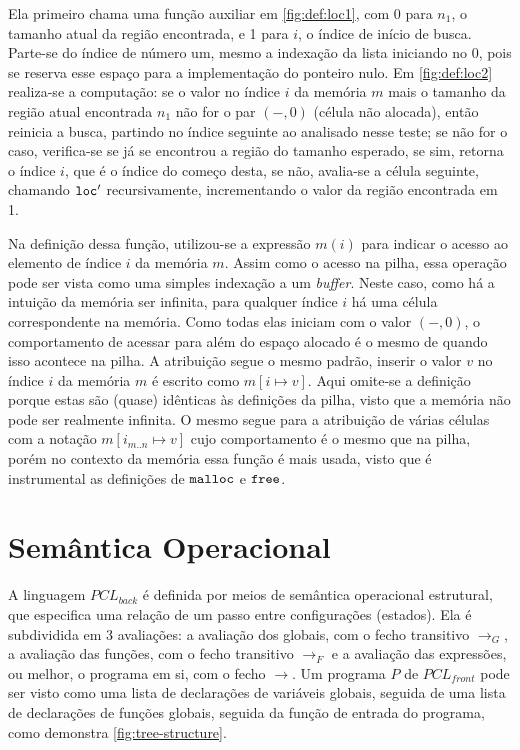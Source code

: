 \noindent Ela primeiro chama uma função auxiliar em \ref{fig:def:loc1}, com 0 para $n_1$, o tamanho atual da região encontrada,  e 1 para $i$, o índice de início de busca. Parte-se do índice de número um, mesmo a indexação da lista iniciando no 0, pois se reserva esse espaço para a implementação do ponteiro nulo. Em \ref{fig:def:loc2} realiza-se a computação: se o valor no índice $i$ da memória $m$ mais o tamanho da região atual encontrada $n_1$ não for o par $(-,0)$ (célula não alocada), então reinicia a busca, partindo no índice seguinte ao analisado nesse teste; se não for o caso, verifica-se se já se encontrou a região do tamanho esperado, se sim, retorna o índice $i$, que é o índice do começo desta, se não, avalia-se a célula seguinte, chamando $\texttt{loc}'$ recursivamente, incrementando o valor da região encontrada em 1.

Na definição dessa função, utilizou-se a expressão $m(i)$ para indicar o acesso ao elemento de índice $i$ da memória $m$. Assim como o acesso na pilha, essa operação pode ser vista como uma simples indexação a um \emph{buffer}. Neste caso, como há a intuição da memória ser infinita, para qualquer índice $i$ há uma célula correspondente na memória. Como todas elas iniciam com o valor $(-,0)$, o comportamento de acessar para além do espaço alocado é o mesmo de quando isso acontece na pilha. A atribuição segue o mesmo padrão, inserir o valor $v$ no índice $i$ da memória $m$ é escrito como $m[i \mapsto v]$. Aqui omite-se a definição porque estas são (quase) idênticas às definições da pilha, visto que a memória não pode ser realmente infinita. O mesmo segue para a atribuição de várias células com a notação $m[i_{m..n} \mapsto v]$ cujo comportamento é o mesmo que na pilha, porém no contexto da memória essa função é mais usada, visto que é  instrumental as definições de $\texttt{malloc}$ e $\texttt{free}$.


\section{Semântica Operacional}
\label{sec:pcl-back:semantica}

A linguagem $PCL_{back}$ é definida por meios de semântica operacional estrutural, que especifica uma relação de um passo entre configurações (estados). Ela é subdividida em 3 avaliações: a avaliação dos globais, com o fecho transitivo $\to_G$, a avaliação das funções, com o fecho transitivo $\to_F$ e a avaliação das expressões, ou melhor, o programa em si, com o fecho $\to$. Um programa $P$ de $PCL_{front}$ pode ser visto como uma lista de declarações de variáveis globais, seguida de uma lista de declarações de funções globais, seguida da função de entrada do programa, como demonstra \ref{fig:tree-structure}.

